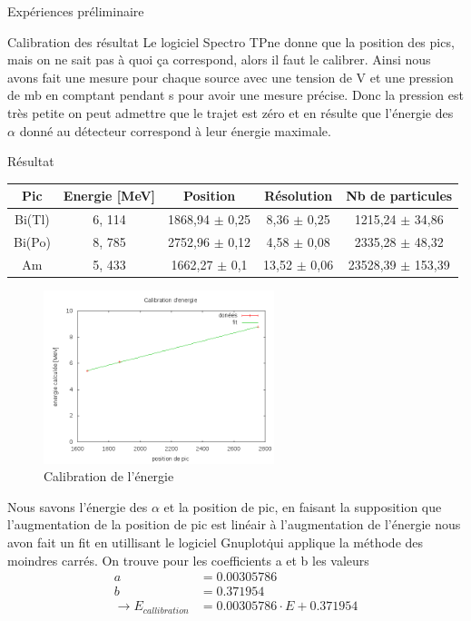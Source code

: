 \documentclass[a4paper,11pt,liststotocnumbered,bibtotocnumbered]{scrartcl}
\begin{document}
\begin{section}{Expériences préliminaire}
  \begin{subsection}{Calibration des résultat}
   Le logiciel \flqq Spectro TP\frqq ne donne que la position des pics, mais on ne sait pas à quoi \c ca correspond, alors il faut le calibrer. Ainsi nous avons fait une mesure pour chaque source avec une tension de \unit[80]{V} et une pression de \unit[0,78]{mb} en comptant pendant \unit[300]{s} pour avoir une mesure précise. Donc la pression est très petite on peut admettre que le trajet est zéro et en résulte que l'énergie des $\alpha$ donné au détecteur correspond à leur énergie maximale.
   \begin{paragraph}{Résultat}
    \begin{center}
     \begin{tabular}{c|c|c|c|c}
      Pic	& Energie [MeV] &	Position	&	Résolution	&	Nb de particules	\\ \hline
      Bi(Tl)	&6, 114	 &1868,94 $\pm$ 0,25 	&8,36 $\pm$ 0,25	&1215,24 $\pm$ 34,86	\\
      Bi(Po)	&8, 785	&2752,96 $\pm$ 0,12	&4,58 $\pm$ 0,08	&2335,28 $\pm$ 48,32	\\ 
      Am	&5, 433 &1662,27 $\pm$ 0,1	&13,52 $\pm$ 0,06	&23528,39 $\pm$ 153,39	\\ 
     \end{tabular}
    \end{center}
    \begin{figure}[H]
     \begin{center}
      \includegraphics[width=0.6\textwidth]{Bilder/calibration.png}
      \caption{Calibration de l'énergie}
     \end{center}
    \end{figure}
   \end{paragraph}
   Nous savons l'énergie des $\alpha$ et la position de pic, en faisant la supposition que l'augmentation de la position de pic est linéair à l'augmentation de l'énergie nous avon fait un fit en utillisant le logiciel \flqq Gnuplot\frqq\. qui applique la méthode des moindres carrés. On trouve pour les coefficients a et b les valeurs
   \begin{align*}
    a&= 0.00305786 \\
    b&= 0.371954 \\
    \rightarrow E_{callibration} &= 0.00305786  \cdot E +0.371954 
   \end{align*}
  \end{subsection}


\end{section}
\end{document}
